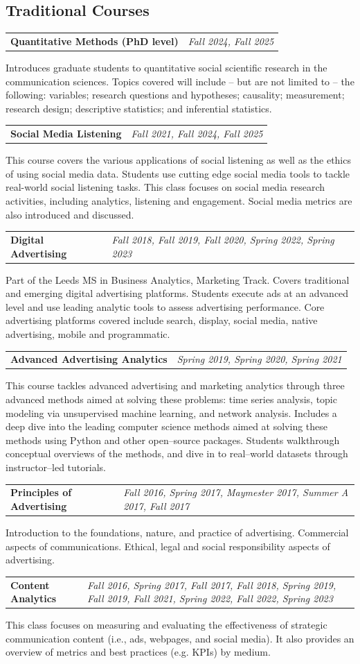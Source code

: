 \documentclass[11pt,letterpaper]{article}
\makeatletter
\newcommand{\cvcourse}[3]{%
  \begin{tabularx}{\textwidth}{@{}X >{\raggedleft\arraybackslash}p{0.33\textwidth}@{}}%
    \textbf{#1} & \textit{#2} \\
  \end{tabularx}\par
  {\small #3}\par
  \vspace{0.35em}
}
\makeatother
\begin{document}
\subsection*{Traditional Courses}
\cvcourse{Quantitative Methods (PhD level)}{Fall 2024, Fall 2025}{Introduces graduate students to quantitative social scientific research in the communication sciences. Topics covered will include -- but are not limited to -- the following: variables; research questions and hypotheses; causality; measurement; research design; descriptive statistics; and inferential statistics.}
\cvcourse{Social Media Listening}{Fall 2021, Fall 2024, Fall 2025}{This course covers the various applications of social listening as well as the ethics of using social media data. Students use cutting edge social media tools to tackle real-world social listening tasks. This class focuses on social media research activities, including analytics, listening and engagement. Social media metrics are also introduced and discussed.}
\cvcourse{Digital Advertising}{Fall 2018, Fall 2019, Fall 2020, Spring 2022, Spring 2023}{Part of the Leeds MS in Business Analytics, Marketing Track. Covers traditional and emerging digital advertising platforms. Students execute ads at an advanced level and use leading analytic tools to assess advertising performance. Core advertising platforms covered include search, display, social media, native advertising, mobile and programmatic.}
\cvcourse{Advanced Advertising Analytics}{Spring 2019, Spring 2020, Spring 2021}{This course tackles advanced advertising and marketing analytics through three advanced methods aimed at solving these problems: time series analysis, topic modeling via unsupervised machine learning, and network analysis. Includes a deep dive into the leading computer science methods aimed at solving these methods using Python and other open--source packages. Students walkthrough conceptual overviews of the methods, and dive in to real--world datasets through instructor--led tutorials.}
\cvcourse{Principles of Advertising}{Fall 2016, Spring 2017, Maymester 2017, Summer A 2017, Fall 2017}{Introduction to the foundations, nature, and practice of advertising. Commercial aspects of communications. Ethical, legal and social responsibility aspects of advertising.}
\cvcourse{Content Analytics}{Fall 2016, Spring 2017, Fall 2017, Fall 2018, Spring 2019, Fall 2019, Fall 2021, Spring 2022, Fall 2022, Spring 2023}{This class focuses on measuring and evaluating the effectiveness of strategic communication content (i.e., ads, webpages, and social media). It also provides an overview of metrics and best practices (e.g. KPIs) by medium.}
\end{document}
